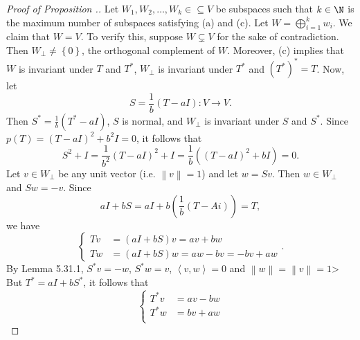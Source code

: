 \documentclass[linearalgebraII]{subfiles}
\begin{document}

    \begin{proof}[Proof of Proposition \thechapter.\thestcounter]
        Let $W_1,W_2,\ldots,W_k\in\subseteq V$ be subspaces such that $k\in\N$ is the maximum number of subspaces satisfying (a) and (c). Let $W = \bigoplus^{k}_{i=1} w_i$. We claim that $W= V$. To verify this, suppose $W\subsetneq V$ for the sake of contradiction. Then $W_\perp\neq\left\lbrace 0 \right\rbrace$, the orthogonal complement of $W$. Moreover, (c) implies that $W$ is invariant under $T$ and $T^{*}$, $W_\perp$ is invariant under $T^{*}$ and $\left( T^{*}  \right) ^{*}  = T$. Now, let
        \begin{equation*}
            S = \frac{1}{b}\left( T-aI \right) : V\to V.
        \end{equation*}
        Then $S^{*} = \frac{1}{b}\left( T^{*} - aI \right)$, $S$ is normal, and $W_\perp$ is invariant under $S$ and $S^{*}$. Since $p(T) = \left( T-aI \right) ^{2} + b^2I = 0$, it follows that
        \begin{equation*}
            S^2+I = \frac{1}{b^2} \left( T-aI \right) ^2 + I = \frac{1}{b} \left( \left( T-aI \right)^2 + bI \right) = 0.
        \end{equation*}
        Let $v\in W_\perp$ be any unit vector (i.e. $\left\lVert v\right\rVert = 1$) and let $w=Sv$. Then $w\in W_\perp$ and $Sw = -v$. Since
        \begin{equation*}
            aI + bS = aI + b\left( \frac{1}{b}\left( T-Ai \right)  \right) = T,
        \end{equation*}
        we have
        \begin{equation*}
            \begin{cases} 
                Tv & = \left( aI+bS \right) v = av+bw \\
                Tw & = \left( aI+bS \right) w = aw-bv = -bv+aw
            \end{cases}.
        \end{equation*}
        By Lemma 5.31.1, $S^{*} v = -w$, $S^{*} w = v$, $\left\langle v, w\right\rangle = 0$ and $\left\lVert w\right\rVert =\left\lVert v\right\rVert = 1$> But $T^{*}  = aI + bS^{*}$, it follows that
        \begin{equation*}
            \begin{cases} 
                T^{*} v & = av - bw \\
                T^{*} w & = bv + aw \\

\end{cases}
\end{equation*}
\end{proof}
\end{document}
